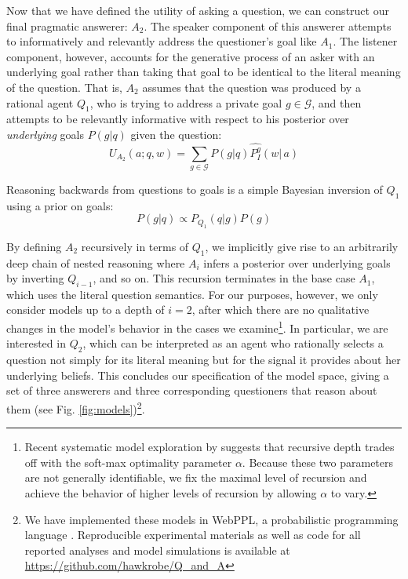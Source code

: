 \documentclass[11pt, floatsintext]{apa6}
\begin{document}
Now that we have defined the utility of asking a question, we can construct our final pragmatic answerer: $A_2$. The speaker component of this answerer attempts to informatively and relevantly address the questioner's goal like $A_1$. The listener component, however, accounts for the generative process of an asker with an underlying goal rather than taking that goal to be identical to the literal meaning of the question. That is, $A_2$ assumes that the question was produced by a rational agent $Q_1$, who is trying to address a private goal $g \in \mathcal{G}$, and then attempts to be relevantly informative with respect to his posterior over \emph{underlying} goals $P(g|q)$ given the question:
\begin{equation}
U_{A_2}(a; q, w) = \sum_{g \in \mathcal{G}} P(g|q) \widehat{P^g_I}(w|\,a)
\end{equation}

%
Reasoning backwards from questions to goals is a simple Bayesian inversion of $Q_1$ using a prior on goals:
$$
P(g|q) \propto P_{Q_1}(q|g)P(g)
$$

By defining $A_2$ recursively in terms of $Q_1$, we implicitly give rise to an arbitrarily deep chain of nested reasoning where $A_{i}$ infers a posterior over underlying goals by inverting $Q_{i-1}$, and so on. This recursion terminates in the base case $A_1$, which uses the literal question semantics. For our purposes, however, we only consider models up to a depth of $i=2$, after which there are no qualitative changes in the model's behavior in the cases we examine\footnote{Recent systematic model exploration by  suggests that recursive depth trades off with the soft-max optimality parameter $\alpha$. Because these two parameters are not generally identifiable, we fix the maximal level of recursion and achieve the behavior of higher levels of recursion by allowing $\alpha$ to vary.}. In particular, we are interested in $Q_2$, which can be interpreted as an agent who rationally selects a question not simply for its literal meaning but for the signal it provides about her underlying beliefs. This concludes our specification of the model space, giving a set of three answerers and three corresponding questioners that reason about them (see Fig. \ref{fig:models})\footnote{We have implemented these models in WebPPL, a probabilistic programming language \cite{GoodmanStuhlmuller14_DIPPL}. Reproducible experimental materials as well as code for all reported analyses and model simulations is available at \url{https://github.com/hawkrobe/Q\_and\_A}}.
 
\end{document}
